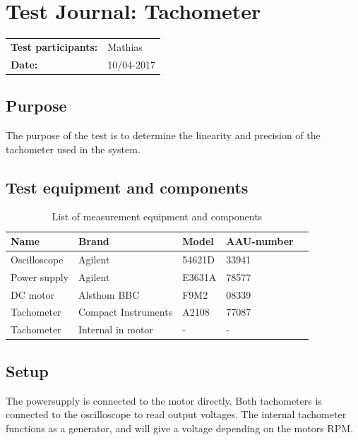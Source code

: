\graphicspath{{figures/design/}}
\chapter{Test Journal: Tachometer}\label{appendix:RPMTest}
\begin{table}[!h]
\begin{tabular}{l l}
\textbf{Test participants:} & Mathias  \\
\textbf{Date:}  & 10/04-2017
\end{tabular}
\end{table}

\section*{Purpose}
The purpose of the test is to determine the linearity and precision of the tachometer used in the system.
\section*{Test equipment and components}
\begin{table}[htbp]
	\centering
	\caption{List of measurement equipment and components}\label{tab_appendix:RPMSetup}
	\begin{tabularx}{\textwidth}{lXXXX}
		Name & Brand & Model & AAU-number \\ \toprule \rowcolor{lightGrey}
		Oscilloscope	& Agilent & 54621D & 33941 	\\
		Power supply	& Agilent & E3631A & 78577\\ 
		\rowcolor{lightGrey}	
		DC motor & Alsthom BBC & F9M2& 08339\\
		Tachometer & Compact \newline Instruments & A2108& 77087 \\ \rowcolor{lightGrey}
		Tachometer & Internal in motor& - & -
	\end{tabularx}
\end{table}
\section*{Setup}
The powersupply is connected to the motor directly. Both tachometers is connected to the oscilloscope to read output voltages. The internal tachometer functions as a generator, and will give a voltage depending on the motors RPM.  
